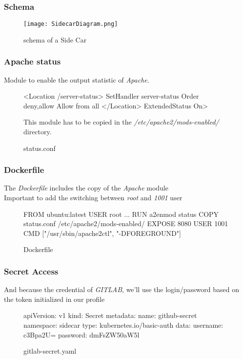 
\begin{frame}[fragile]
  \frametitle{Schema}
\begin{figure}[ht]
  \caption{schema of a Side Car}
  \centering
  \texttt{[image: SidecarDiagram.png]}
  \label{fig:SidecarDiagram}
\end{figure}
\end{frame}

\begin{frame}[fragile]
  \frametitle{Apache status}
  Module to enable the output statistic of \emph{Apache}.

  \begin{figure}
    \begin{apachecode}
      <Location /server-status>
        SetHandler server-status
        Order deny,allow
        Allow from all
      </Location> ExtendedStatus On>
    \end{apachecode}
    \caption{status.conf}

    This module has to be copied in the \emph{/etc/apache2/mods-enabled/} directory.
  \end{figure}
\end{frame}

\begin{frame}[fragile]
  \frametitle{Dockerfile}
  The \emph{Dockerfile} includes the copy of the \emph{Apache} module\\
  Important to add the switching between \textit{root} and \textit{1001} user
  \begin{figure}
    \begin{dockercode}
      FROM ubuntu:latest
      USER root
      ...
      RUN a2enmod status
      COPY status.conf /etc/apache2/mods-enabled/
      EXPOSE 8080
      USER 1001
      CMD ["/usr/sbin/apache2ctl", "-DFOREGROUND"]
    \end{dockercode}
    \caption{Dockerfile}
  \end{figure}

\end{frame}

\begin{frame}[fragile]
  \frametitle{Secret Access}
  And because the credential of \emph{GITLAB}, we'll use the login/password based on the token initialized in our profile
  \begin{figure}
    \begin{yamlcode}
      apiVersion: v1
      kind: Secret
      metadata:
        name: github-secret
        namespace: sidecar
      type: kubernetes.io/basic-auth
      data:
        username: c3Bpa2U=
        password: dmFsZW50aW5l
    \end{yamlcode}
    \caption{gitlab-secret.yaml}
  \end{figure}
\end{frame}

